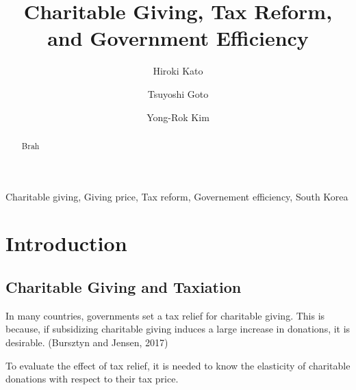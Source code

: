 \documentclass[ review  , 3p ]{elsarticle}
\begin{document}
  \begin{frontmatter}

    \title{Charitable Giving, Tax Reform, and Government Efficiency}
                \author[Osaka University]{
      Hiroki Kato 
       \corref{*} }
        \author[Chiba University]{
      Tsuyoshi Goto 
      }
        \author[Kobe University]{
      Yong-Rok Kim 
      }
            \address[Osaka University]{Graduate School of Economics, Osaka University, Japan}
        \address[Chiba University]{Graduate School of Economics, Chiba University, Japan}
        \address[Kobe University]{Graduate School of Economics, Kobe University, Japan}
      
        \begin{abstract}
      Brah
    \end{abstract}
      
        \begin{keyword}
      Charitable giving, Giving price, Tax reform, Governement efficiency, South Korea
    \end{keyword}
    
  \end{frontmatter}

  \hypertarget{introduction}{%
  \section{Introduction}\label{introduction}}
  
  \hypertarget{charitable-giving-and-taxiation}{%
  \subsection{Charitable Giving and Taxiation}\label{charitable-giving-and-taxiation}}
  
  In many countries, governments set a tax relief for charitable giving.
  This is because, if subsidizing charitable giving induces a large increase in donations, it is desirable. (Bursztyn and Jensen, 2017)
  
  To evaluate the effect of tax relief, it is needed to know the elasticity of charitable donations with respect to their tax price.
  
\end{document}
